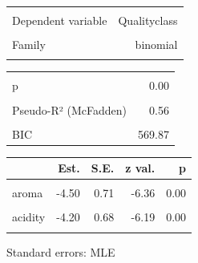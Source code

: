 \documentclass[
  letterpaper,
  DIV=11,
  numbers=noendperiod]{scrartcl}
\begin{document}
\begin{table}[!h]
\centering
\begin{tabular}{lr}
\toprule
\cellcolor{gray!10}{Observations} & \cellcolor{gray!10}{882}\\
Dependent variable & Qualityclass\\
\cellcolor{gray!10}{Type} & \cellcolor{gray!10}{Generalized linear model}\\
Family & binomial\\
\cellcolor{gray!10}{Link} & \cellcolor{gray!10}{logit}\\
\bottomrule
\end{tabular}
\end{table} \begin{table}[!h]
\centering
\begin{tabular}{lr}
\toprule
\cellcolor{gray!10}{$\chi^2$(4)} & \cellcolor{gray!10}{685.59}\\
p & 0.00\\
\cellcolor{gray!10}{Pseudo-R² (Cragg-Uhler)} & \cellcolor{gray!10}{0.72}\\
Pseudo-R² (McFadden) & 0.56\\
\cellcolor{gray!10}{AIC} & \cellcolor{gray!10}{545.96}\\
\addlinespace
BIC & 569.87\\
\bottomrule
\end{tabular}
\end{table} \begin{table}[!h]
\centering
\begin{threeparttable}
\begin{tabular}{lrrrr}
\toprule
  & Est. & S.E. & z val. & p\\
\midrule
\cellcolor{gray!10}{(Intercept)} & \cellcolor{gray!10}{120.10} & \cellcolor{gray!10}{8.73} & \cellcolor{gray!10}{13.76} & \cellcolor{gray!10}{0.00}\\
aroma & -4.50 & 0.71 & -6.36 & 0.00\\
\cellcolor{gray!10}{flavor} & \cellcolor{gray!10}{-7.08} & \cellcolor{gray!10}{0.87} & \cellcolor{gray!10}{-8.18} & \cellcolor{gray!10}{0.00}\\
acidity & -4.20 & 0.68 & -6.19 & 0.00\\
\cellcolor{gray!10}{altitude\_mean\_meters} & \cellcolor{gray!10}{-0.00} & \cellcolor{gray!10}{0.00} & \cellcolor{gray!10}{-2.92} & \cellcolor{gray!10}{0.00}\\
\bottomrule
\end{tabular}
\begin{tablenotes}
\item Standard errors: MLE
\end{tablenotes}
\end{threeparttable}
\end{table}
\end{document}
